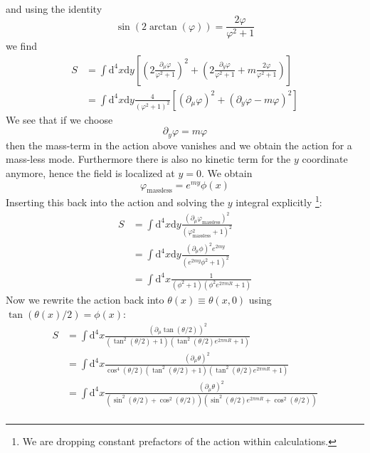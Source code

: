 \documentclass[master,       %
               twoside,        %
               BCOR10mm,       %
               english,ngerman, %
               ]{GAUBM}
\begin{document}
\begin{otherlanguage}{english}
\begin{align}
\end{align}
and using the identity
\begin{equation}
	\sin(2 \arctan(\varphi)) = \frac{2 \varphi}{\varphi^2 + 1}
\end{equation}
we find
\begin{align}
    S &= \int \mathrm{d}^4 x \mathrm{d} y \left[
    \left(2 \frac{\partial_\mu \varphi}{\varphi^2 + 1} \right)^2 + 
    \left(2 \frac{\partial_y \varphi}{\varphi^2 + 1} + m \frac{2 \varphi}{\varphi^2 + 1} \right) \right] \nonumber \\
    &= \int \mathrm{d}^4 x \mathrm{d} y  \frac{4}{(\varphi^2 + 1)^2}
    \left[ (\partial_\mu \varphi)^2 + (\partial_y \varphi - m \varphi)^2 \right]
\end{align}
We see that if we choose 
\begin{equation}
	\partial_y \varphi = m \varphi
\end{equation}
then the mass-term in the action above vanishes and we obtain the action for a mass-less mode. Furthermore there is also no kinetic term for the $y$ coordinate anymore, hence the field is localized at $y = 0$.
We obtain
\begin{equation}
	\varphi_{\mathrm{massless}} = e^{my} \phi(x) 
\end{equation}
Inserting this back into the action and solving the $y$ integral explicitly \footnote{We are dropping constant prefactors of the action within calculations.}:
\begin{align}
	S &= \int \mathrm{d}^4 x \mathrm{d} y  \frac{(\partial_\mu \varphi_{\mathrm{massless}})^2}{(\varphi_{\mathrm{massless}}^2 + 1)^2} \nonumber \\
	&= \int \mathrm{d}^4 x \mathrm{d} y  \frac{(\partial_\mu \phi)^2 e^{2my}}{(e^{2my} \phi^2 + 1)^2} \nonumber \\
	&= \int \mathrm{d}^4 x\frac{1}{(\phi^2 + 1)(\phi^2 e^{2\pi m R} + 1)}
\end{align}
Now we rewrite the action back into $\theta(x) \equiv \theta(x, 0)$ using $\tan(\theta(x)/2) = \phi(x)$:
\begin{align}
	 S &= \int \mathrm{d}^4 x \frac{(\partial_\mu \tan(\theta / 2))^2}{(\tan^2(\theta / 2) + 1)(\tan^2(\theta / 2) e^{2\pi m R} + 1)} \nonumber \\
	 &= \int \mathrm{d}^4 x \frac{(\partial_\mu \theta)^2}{\cos^4(\theta/2)(\tan^2(\theta / 2) + 1)(\tan^2(\theta / 2) e^{2\pi m R} + 1)} \nonumber \\
	 &= \int \mathrm{d}^4 x \frac{(\partial_\mu \theta)^2}{(\sin^2(\theta / 2) + \cos^2(\theta/2))(\sin^2(\theta / 2) e^{2\pi m R} + \cos^2(\theta / 2))} \nonumber \\

\end{align}
\end{otherlanguage}
\end{document}
